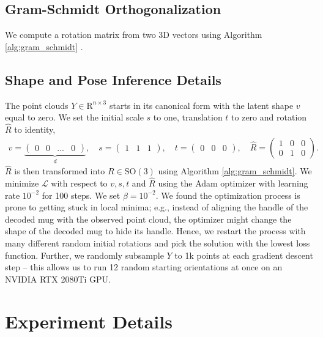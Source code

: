 \documentclass{article}
\begin{document}
\subsection{Gram-Schmidt Orthogonalization}

We compute a rotation matrix from two 3D vectors using Algorithm \ref{alg:gram_schmidt} \cite{park22learning}.



\subsection{Shape and Pose Inference Details}
\label{appendix:method:inference}

The point clouds $Y \in \mathrm{R}^{n \times 3}$ starts in its canonical form with the latent shape $v$ equal to zero. We set the initial scale $s$ to one, translation $t$ to zero and rotation $\hat{R}$ to identity,
\begin{align}
    v = \underbrace{\begin{pmatrix} 0 & 0 & ... & 0 \end{pmatrix}}_d,\quad s = \begin{pmatrix} 1 & 1 & 1 \end{pmatrix},\quad t = \begin{pmatrix} 0 & 0 & 0 \end{pmatrix},\quad \hat{R} = \begin{pmatrix} 1 & 0 & 0 \\ 0 & 1 & 0 \end{pmatrix}.
\end{align}
$\hat{R}$ is then transformed into $R \in \mathrm{SO}(3)$ using Algorithm \ref{alg:gram_schmidt}. We minimize $\mathcal{L}$ with respect to $v, s, t$ and $\hat{R}$ using the Adam optimizer \cite{kingma17adam} with learning rate $10^{-2}$ for 100 steps. We set $\beta=10^{-2}$. We found the optimization process is prone to getting stuck in local minima; e.g., instead of aligning the handle of the decoded mug with the observed point cloud, the optimizer might change the shape of the decoded mug to hide its handle. Hence, we restart the process with many different random initial rotations and pick the solution with the lowest loss function. Further, we randomly subsample $Y$ to 1k points at each gradient descent step -- this allows us to run 12 random starting orientations at once on an NVIDIA RTX 2080Ti GPU.


\section{Experiment Details}
\label{appendix:experiment}
\end{document}
